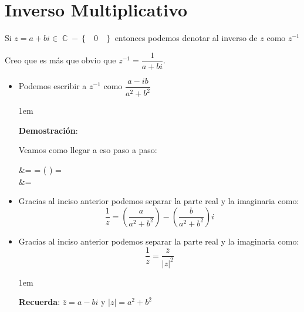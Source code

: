 \documentclass[12pt, fleqn]{report}                             %
\newenvironment{SmallIndentation}[1][0.75em]                    %
    {\begin{adjustwidth}{#1}{}\begin{footnotesize}}                 %
    {\end{footnotesize}\end{adjustwidth}}                           %
\DeclareMathOperator \Space {\quad}                             %
\DeclareMathOperator \MiniSpace {\;}                            %
\newcommand{\Set}[1]{\left\{ \MiniSpace #1 \MiniSpace \right\}} %
\newcommand{\Parentheses}[1]{\left( #1 \right)}                 %
\newcommand{\pfrac}[2]{\Parentheses{\dfrac{#1}{#2}}}            %
\newenvironment{MultiLineEquation*}[1]                          %
        {\begin{equation*}\begin{alignedat}{#1}}                    %
        {\end{alignedat}\end{equation*}}                            %
\DeclareMathOperator \Complexs  {\mathbb{C}}                     %
\begin{document}
        \clearpage
        \section{Inverso Multiplicativo}
            
            Si $z = a + bi \in \Complexs - \Set{0}$ entonces podemos denotar al inverso de $z$ como
            $z^{-1}$

            Creo que es más que obvio que $z^{-1} = \dfrac{1}{a+bi}$.

            \begin{itemize}

                \item
                    Podemos escribir a $z^{-1}$ como $\dfrac{a-ib}{a^2+b^2}$
                    \begin{SmallIndentation}[1em]
                        \textbf{Demostración}:
                        
                        Veamos como llegar a eso paso a paso:
                        \begin{MultiLineEquation*}{1}
                             &=                          
                                          = \pfrac{a-bi}{a-bi}
                                          =               \\
                                         &=                  
                        \end{MultiLineEquation*}

                    \end{SmallIndentation}



                \item
                    Gracias al inciso anterior podemos separar la parte real y la imaginaria como:
                    \begin{equation}
                         \dfrac{1}{z} = \pfrac{a}{a^2+b^2} - \pfrac{b}{a^2+b^2}i 
                    \end{equation}


                \item
                    Gracias al inciso anterior podemos separar la parte real y la imaginaria como:
                    \begin{equation}
                         \dfrac{1}{z} = \dfrac{\overline{z}}{|z|^2}
                    \end{equation}

                    \begin{SmallIndentation}[1em]
                        \textbf{Recuerda}: $\overline{z} = a - bi$ y $|z| = a^2 + b^2$
                    \end{SmallIndentation}

                

            \end{itemize}




            
\end{document}

